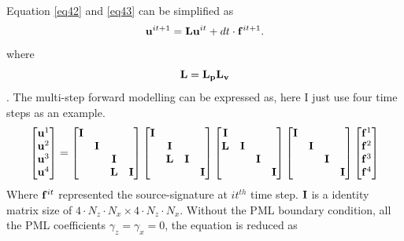 \documentclass[revised,endfloat]{geophysics}
\begin{document}
Equation \ref{eq42} and \ref{eq43} can be simplified as 
\begin{equation}
{\bf u}^{it+1} = {\bf L} {\bf u}^{it} + dt \cdot {\bf f}^{it+1}.
\label{eq44}
\end{equation}
where $${\bf L} = {\bf L_p}{\bf L_v}$$.
The multi-step forward modelling can be expressed as, here I just use four time steps as an example.
\begin{equation}
\begin{bmatrix}
{\bf u}^1 \\
{\bf u}^2 \\
{\bf u}^3 \\
{\bf u}^4 \\
\end{bmatrix}
=
\begin{bmatrix}
{\bf I} & & & \\
 & {\bf I} & & \\
 & &  {\bf I}& \\
 & & {\bf L}& {\bf I} \\
\end {bmatrix}
\begin{bmatrix}
{\bf I} & & & \\
 & {\bf I} & & \\
 & {\bf L} &  {\bf I}& \\
 & & & {\bf I} \\
\end {bmatrix}
\begin{bmatrix}
{\bf I} & & & \\
{\bf L} & {\bf I} & & \\
 & &  {\bf I}& \\
 & & & {\bf I} \\
\end {bmatrix}
\begin{bmatrix}
{\bf I} & & & \\
& {\bf I} & & \\
 & &  {\bf I}& \\
 & & & {\bf I} \\
\end {bmatrix}
\begin{bmatrix}
{\bf f}^1 \\
{\bf f}^2 \\
{\bf f}^3 \\
{\bf f}^4 \\
\end{bmatrix}
\label{eq45}
\end{equation}
Where ${\bf f}^{it}$ represented the source-signature at $it^{th}$ time step. ${\bf I}$ is a identity matrix size of $4 \cdot N_z \cdot N_x \times  4 \cdot N_z \cdot N_x$. Without the PML boundary condition, all the PML coefficients $\gamma_z = \gamma_x= 0$, the equation is reduced as
\end{document}
